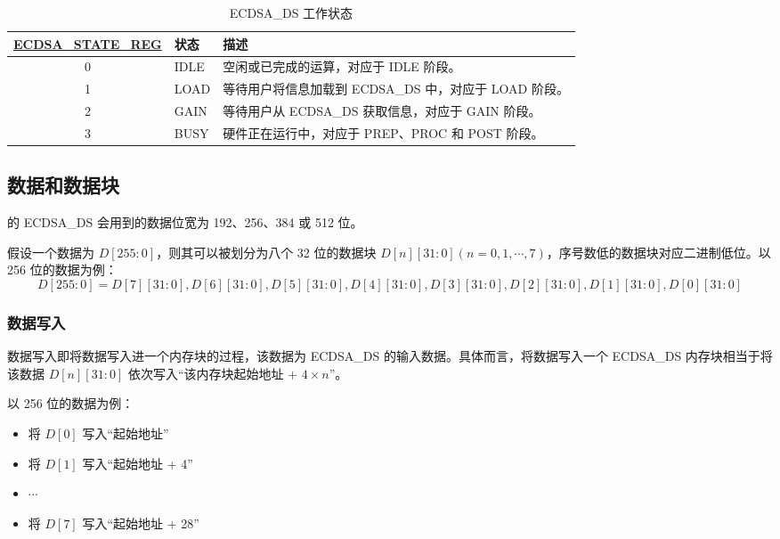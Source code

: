 \documentclass[main\_\_CN.tex]{subfiles}
\begin{document}
\begin{table}[H]
    \centering
    \caption{ECDSA\_DS 工作状态}
    \label{tab:ecdsa-working-state}
    \begin{tabular}{ | c | l | L{8cm} | }
    \hline
        \textbf{\hyperref[regdesc:ECDSASTATEREG]{ECDSA\_STATE\_REG}} & \textbf{状态} &  \textbf{描述} \\     & IDLE      &   空闲或已完成的运算，对应于 IDLE 阶段。\\     & LOAD      &   等待用户将信息加载到 ECDSA\_DS 中，对应于 LOAD 阶段。    \\     & GAIN      &   等待用户从 ECDSA\_DS 获取信息，对应于 GAIN 阶段。    \\     & BUSY      &   硬件正在运行中，对应于 PREP、PROC 和 POST 阶段。    \\ \hline
    \end{tabular}
\end{table}

\subsection{数据和数据块}

\chipname{} 的 ECDSA\_DS 会用到的数据位宽为 192、256、384 或 512 位。

假设一个数据为 $D[255:0]$，则其可以被划分为八个 32 位的数据块 $D[n][31:0](n=0,1,\cdots,7)$，序号数低的数据块对应二进制低位。以 256 位的数据为例：
\[
D[255:0] = {D[7][31:0],D[6][31:0],D[5][31:0],
D[4][31:0],D[3][31:0],D[2][31:0],D[1][31:0],D[0][31:0]}
\]

\subsubsection{数据写入}

数据写入即将数据写入进一个内存块的过程，该数据为 ECDSA\_DS 的输入数据。具体而言，将数据写入一个 ECDSA\_DS 内存块相当于将该数据 $D[n][31:0]$ 依次写入“该内存块起始地址 + $4 \times n$”。

以 256 位的数据为例：

\begin{itemize}
    \item 将 $D[0]$ 写入“起始地址”
    \item 将 $D[1]$ 写入“起始地址 + 4”
    \item $\cdots$
    \item 将 $D[7]$ 写入“起始地址 + 28”
\end{itemize}
\end{document}
